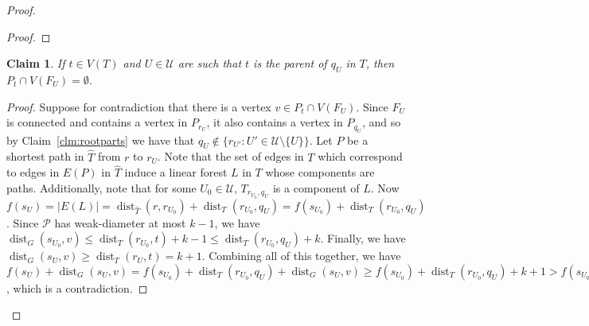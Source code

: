 \documentclass[11pt]{article}
\renewcommand{\geq}{\geqslant}
\renewcommand{\leq}{\leqslant}
\DeclareMathOperator{\dist}{dist}
\DeclareMathOperator{\tw}{tw}
\theoremstyle{plain}
\newtheorem{claim}{Claim}[thm]
\theoremstyle{definition}
\newcommand{\PP}{\mathcal{P}}
\begin{document}
\begin{proof}
\begin{proof}
				
				
			\end{proof}
				
			
			\begin{claim}\label{clm:quparent}
				If $t\in V(T)$ and $U\in \mathcal{U}$ are such that $t$ is the parent of $q_U$ in $T$, then $P_t\cap V(F_U)=\emptyset$.
			\end{claim}
			\begin{proof}
				Suppose for contradiction that there is a vertex $v\in P_t\cap V(F_U)$.
				Since $F_U$ is connected and contains a vertex in $P_{r_U}$, it also contains a vertex in $P_{q_U}$, and so by Claim~\ref{clm:rootparts} we have that $q_U\notin \{r_{U'}:U'\in \mathcal{U}\setminus \{U\}\}$.
				Let $P$ be a shortest path in $\hat{T}$ from $r$ to $r_U$.
				Note that the set of edges in $T$ which correspond to edges in $E(P)$ in $\hat{T}$ induce a linear forest $L$ in $T$ whose components are paths. 
				Additionally, note that for some $U_0\in \mathcal{U}$, $T_{r_{U_0},q_U}$ is a component of $L$.
				Now $f(s_U)=|E(L)|=\dist_{\hat{T}}(r,r_{U_0})+\dist_T(r_{U_0},q_U)=f(s_{U_0})+\dist_T(r_{U_0},q_U)$.
				Since $\PP$ has weak-diameter at most $k-1$, we have $\dist_G(s_{U_0},v)\leq \dist_T(r_{U_0},t)+k-1\leq \dist_T(r_{U_0},q_U)+k$.
				Finally, we have $\dist_G(s_U,v)\geq \dist_T(r_U,t)=k+1$.
				Combining all of this together, we have $f(s_U)+\dist_G(s_U,v)=f(s_{U_0})+\dist_T(r_{U_0},q_U)+\dist_G(s_U,v)\geq f(s_{U_0})+\dist_T(r_{U_0},q_U)+k+1>f(s_{U_0})+\dist_G(s_{U_0},v)$, which is a contradiction.
			\end{proof}
			

\end{proof}
\end{document}
